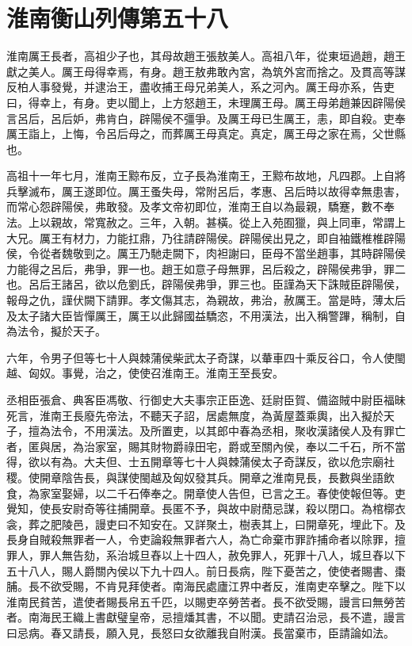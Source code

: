 \chapter{淮南衡山列傳第五十八}

淮南厲王長者，高祖少子也，其母故趙王張敖美人。高祖八年，從東垣過趙，趙王獻之美人。厲王母得幸焉，有身。趙王敖弗敢內宮，為筑外宮而捨之。及貫高等謀反柏人事發覺，并逮治王，盡收捕王母兄弟美人，系之河內。厲王母亦系，告吏曰，得幸上，有身。吏以聞上，上方怒趙王，未理厲王母。厲王母弟趙兼因辟陽侯言呂后，呂后妒，弗肯白，辟陽侯不彊爭。及厲王母已生厲王，恚，即自殺。吏奉厲王詣上，上悔，令呂后母之，而葬厲王母真定。真定，厲王母之家在焉，父世縣也。

高祖十一年七月，淮南王黥布反，立子長為淮南王，王黥布故地，凡四郡。上自將兵擊滅布，厲王遂即位。厲王蚤失母，常附呂后，孝惠、呂后時以故得幸無患害，而常心怨辟陽侯，弗敢發。及孝文帝初即位，淮南王自以為最親，驕蹇，數不奉法。上以親故，常寬赦之。三年，入朝。甚橫。從上入苑囿獵，與上同車，常謂上大兄。厲王有材力，力能扛鼎，乃往請辟陽侯。辟陽侯出見之，即自袖鐵椎椎辟陽侯，令從者魏敬剄之。厲王乃馳走闕下，肉袒謝曰，臣母不當坐趙事，其時辟陽侯力能得之呂后，弗爭，罪一也。趙王如意子母無罪，呂后殺之，辟陽侯弗爭，罪二也。呂后王諸呂，欲以危劉氏，辟陽侯弗爭，罪三也。臣謹為天下誅賊臣辟陽侯，報母之仇，謹伏闕下請罪。孝文傷其志，為親故，弗治，赦厲王。當是時，薄太后及太子諸大臣皆憚厲王，厲王以此歸國益驕恣，不用漢法，出入稱警蹕，稱制，自為法令，擬於天子。

六年，令男子但等七十人與棘蒲侯柴武太子奇謀，以輂車四十乘反谷口，令人使閩越、匈奴。事覺，治之，使使召淮南王。淮南王至長安。

丞相臣張倉、典客臣馮敬、行御史大夫事宗正臣逸、廷尉臣賀、備盜賊中尉臣福昧死言，淮南王長廢先帝法，不聽天子詔，居處無度，為黃屋蓋乘輿，出入擬於天子，擅為法令，不用漢法。及所置吏，以其郎中春為丞相，聚收漢諸侯人及有罪亡者，匿與居，為治家室，賜其財物爵祿田宅，爵或至關內侯，奉以二千石，所不當得，欲以有為。大夫但、士五開章等七十人與棘蒲侯太子奇謀反，欲以危宗廟社稷。使開章陰告長，與謀使閩越及匈奴發其兵。開章之淮南見長，長數與坐語飲食，為家室娶婦，以二千石俸奉之。開章使人告但，已言之王。春使使報但等。吏覺知，使長安尉奇等往捕開章。長匿不予，與故中尉蕑忌謀，殺以閉口。為棺槨衣衾，葬之肥陵邑，謾吏曰不知安在。又詳聚土，樹表其上，曰開章死，埋此下。及長身自賊殺無罪者一人，令吏論殺無罪者六人，為亡命棄市罪詐捕命者以除罪，擅罪人，罪人無告劾，系治城旦舂以上十四人，赦免罪人，死罪十八人，城旦舂以下五十八人，賜人爵關內侯以下九十四人。前日長病，陛下憂苦之，使使者賜書、棗脯。長不欲受賜，不肯見拜使者。南海民處廬江界中者反，淮南吏卒擊之。陛下以淮南民貧苦，遣使者賜長帛五千匹，以賜吏卒勞苦者。長不欲受賜，謾言曰無勞苦者。南海民王織上書獻璧皇帝，忌擅燔其書，不以聞。吏請召治忌，長不遣，謾言曰忌病。春又請長，願入見，長怒曰女欲離我自附漢。長當棄市，臣請論如法。

